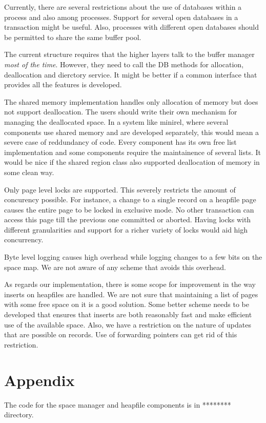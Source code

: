 Currently,  there are several restrictions  about the use of databases
within a  process and also  among processes. Support  for several open
databases   in  a transaction might  be  useful.  Also, processes with
different open databases should be permitted to  share the same buffer
pool.

The  current structure  requires that the   higher layers talk to  the
buffer manager {\em most of the time}. However,  they need to call the
DB  methods  for allocation,  deallocation   and dierctory service. It
might be better if  a common interface that  provides all the features
is developed.

The shared memory implementation handles only allocation of memory but
does  not  support  deallocation. The  users   should write  their own
mechanism for     managing the deallocated space.   In   a system like
minirel, where several components use shared  memory and are developed
separately,  this  would  mean  a  severe   case   of reddundancy   of
code. Every  component has its own  free  list implementation and some
components require the maintainence of several lists. It would be nice
if  the shared region class  also supported deallocation  of memory in
some clean way.

Only   page level locks are   supported.  This severely restricts  the
amount of concurency  possible.  For instance,  a change to   a single
record on  a heapfile page  causes the  entire  page to be  locked  in
exclusive mode. No other  transaction  can access  this page  till the
previous    one  committed or   aborted.   Having locks with different
granularities and support for a richer variety of locks would aid high
concurrency.

Byte level logging causes high overhead while logging changes to a few
bits on the space map. We are not aware of any scheme that avoids this
overhead.

As regards our implementation, there is  some scope for improvement in
the   way inserts on  heapfiles  are  handled. We  are  not sure  that
maintaining  a  list of  pages  with some free space  on  it is a good
solution.  Some better scheme needs to  be developed that ensures that
inserts  are both reasonably  fast  and   make  efficient use  of  the
available space. Also, we have a restriction on  the nature of updates
that are  possible on records. Use  of forwarding pointers can get rid
of this restriction.


\section{Appendix}

The code for the space manager and heapfile components is  in 
******** directory.


